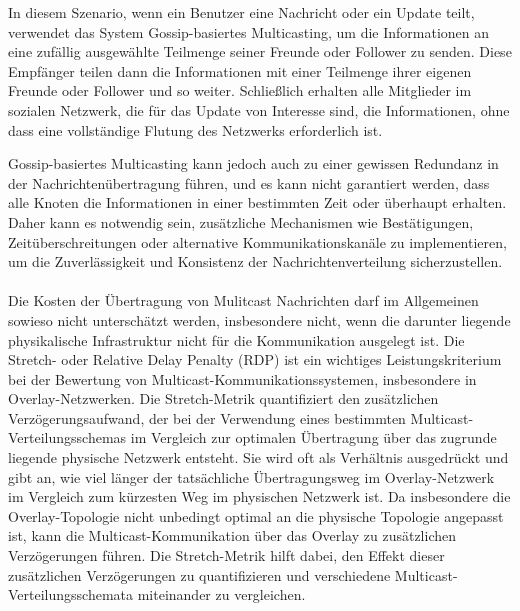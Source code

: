 In diesem Szenario, wenn ein Benutzer eine Nachricht oder ein Update teilt, verwendet das System Gossip-basiertes Multicasting, um die Informationen an eine zufällig ausgewählte Teilmenge seiner Freunde oder Follower zu senden. Diese Empfänger teilen dann die Informationen mit einer Teilmenge ihrer eigenen Freunde oder Follower und so weiter. Schließlich erhalten alle Mitglieder im sozialen Netzwerk, die für das Update von Interesse sind, die Informationen, ohne dass eine vollständige Flutung des Netzwerks erforderlich ist.

Gossip-basiertes Multicasting kann jedoch auch zu einer gewissen Redundanz in der Nachrichtenübertragung führen, und es kann nicht garantiert werden, dass alle Knoten die Informationen in einer bestimmten Zeit oder überhaupt erhalten. Daher kann es notwendig sein, zusätzliche Mechanismen wie Bestätigungen, Zeitüberschreitungen oder alternative Kommunikationskanäle zu implementieren, um die Zuverlässigkeit und Konsistenz der Nachrichtenverteilung sicherzustellen.
\\\\
Die Kosten der Übertragung von Mulitcast Nachrichten darf im Allgemeinen sowieso nicht unterschätzt werden, insbesondere nicht, wenn die darunter liegende physikalische Infrastruktur nicht für die Kommunikation ausgelegt ist. Die Stretch- oder Relative Delay Penalty (RDP) ist ein wichtiges Leistungskriterium bei der Bewertung von Multicast-Kommunikationssystemen, insbesondere in Overlay-Netzwerken. Die Stretch-Metrik quantifiziert den zusätzlichen Verzögerungsaufwand, der bei der Verwendung eines bestimmten Multicast-Verteilungsschemas im Vergleich zur optimalen Übertragung über das zugrunde liegende physische Netzwerk entsteht. Sie wird oft als Verhältnis ausgedrückt und gibt an, wie viel länger der tatsächliche Übertragungsweg im Overlay-Netzwerk im Vergleich zum kürzesten Weg im physischen Netzwerk ist. Da insbesondere die Overlay-Topologie nicht unbedingt optimal an die physische Topologie angepasst ist, kann die Multicast-Kommunikation über das Overlay zu zusätzlichen Verzögerungen führen. Die Stretch-Metrik hilft dabei, den Effekt dieser zusätzlichen Verzögerungen zu quantifizieren und verschiedene Multicast-Verteilungsschemata miteinander zu vergleichen.

